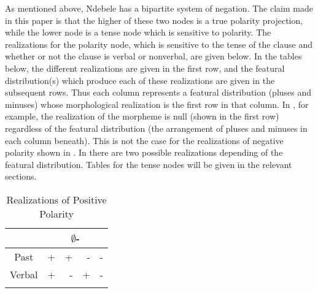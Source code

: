 \documentclass[output=paper]{langsci/langscibook}
\begin{document}
As mentioned above, Ndebele has a bipartite system of negation. The claim made in this paper is that the higher of these two nodes is a true polarity projection, while the lower node is a tense node which is sensitive to polarity. The realizations for the polarity node, which is sensitive to the tense of the clause and whether or not the clause is verbal or nonverbal, are given below. In the tables below, the different realizations are given in the first row, and the featural distribution(s) which produce each of these realizations are given in the subsequent rows. Thus each column represents a featural distribution (pluses and minuses) whose morphological realization is the first row in that column. In , for example, the realization of the morpheme is null (shown in the first row) regardless of the featural distribution (the arrangement of pluses and minuses in each column beneath). This is not the case for the realizations of negative polarity shown in . In  there are two possible realizations depending of the featural distribution. Tables for the tense nodes will be given in the relevant sections.




\begin{table}
\caption{Realizations of Positive Polarity} %
\centering %
\begin{tabular}{c rrrr} %
\lsptoprule%
  &\multicolumn{4}{c}{$\emptyset$-} \\ %
\midrule%
Past & + & + & - & -\\ %
Verbal & + & - & +& -\\[1ex] %
\lspbottomrule%
\end{tabular} 
\label{tab:burkholder:1}
\end{table} 
\end{document}
